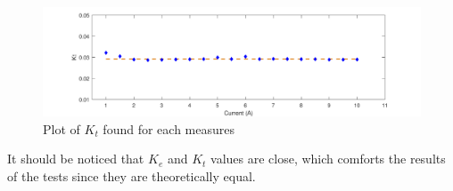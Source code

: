 \begin{figure}[htbp]
	\centering
	\includegraphics[width=\textwidth]{figures/appendix/Motor&GearTests/PlotKt}
	\caption{Plot of $K_t$ found for each measures}\label{fig:KtTest}
\end{figure}
	

It should be noticed that $K_e$ and $K_t$ values are close, which comforts the results of the tests since they are theoretically equal.